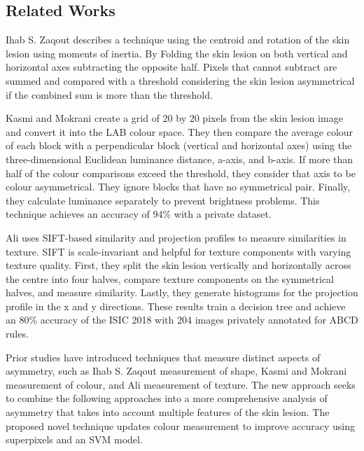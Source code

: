 \subsection{Related Works}
Ihab S. Zaqout\cite{Zaqout2016} describes a technique using the centroid and rotation of the skin lesion using moments of inertia. By Folding the skin lesion on both vertical and horizontal axes subtracting the opposite half. Pixels that cannot subtract are summed and compared with a threshold considering the skin lesion asymmetrical if the combined sum is more than the threshold.

Kasmi and Mokrani\cite{Kasmi2016} create a grid of 20 by 20 pixels from the skin lesion image and convert it into the LAB colour space. They then compare the average colour of each block with a perpendicular block (vertical and horizontal axes) using the three-dimensional Euclidean luminance distance, a-axis, and b-axis. If more than half of the colour comparisons exceed the threshold, they consider that axis to be colour asymmetrical. They ignore blocks that have no symmetrical pair. Finally, they calculate luminance separately to prevent brightness problems. This technique achieves an accuracy of 94\% with a private dataset.

Ali\cite{Ali2020a} uses SIFT-based similarity and projection profiles to measure similarities in texture. SIFT is scale-invariant and helpful for texture components with varying texture quality. First, they split the skin lesion vertically and horizontally across the centre into four halves, compare texture components on the symmetrical halves, and measure similarity. Lastly, they generate histograms for the projection profile in the x and y directions. These results train a decision tree and achieve an 80\% accuracy of the ISIC 2018 with 204 images privately annotated for ABCD rules.

Prior studies have introduced techniques that measure distinct aspects of asymmetry, such as Ihab S. Zaqout\cite{Zaqout2016} measurement of shape, Kasmi and Mokrani\cite{Kasmi2016} measurement of colour, and  Ali\cite{Ali2020a} measurement of texture. The new approach seeks to combine the following approaches into a more comprehensive analysis of asymmetry that takes into account multiple features of the skin lesion. The proposed novel technique updates colour measurement to improve accuracy using superpixels and an SVM model.

